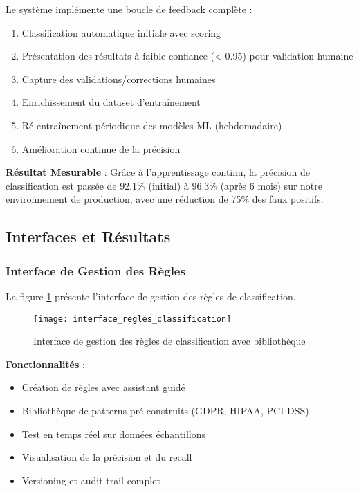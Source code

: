 Le système implémente une boucle de feedback complète :
\begin{enumerate}
    \item Classification automatique initiale avec scoring
    \item Présentation des résultats à faible confiance (< 0.95) pour validation humaine
    \item Capture des validations/corrections humaines
    \item Enrichissement du dataset d'entraînement
    \item Ré-entraînement périodique des modèles ML (hebdomadaire)
    \item Amélioration continue de la précision
\end{enumerate}

\textbf{Résultat Mesurable} : Grâce à l'apprentissage continu, la précision de classification est passée de 92.1\% (initial) à 96.3\% (après 6 mois) sur notre environnement de production, avec une réduction de 75\% des faux positifs.

\subsection{Interfaces et Résultats}

\subsubsection{Interface de Gestion des Règles}

La figure \ref{fig:interface_regles_classification} présente l'interface de gestion des règles de classification.

\begin{figure}[htpb]
\centering
\texttt{[image: interface\_regles\_classification]}
\caption{Interface de gestion des règles de classification avec bibliothèque}
\label{fig:interface_regles_classification}
\end{figure}

\textbf{Fonctionnalités} :
\begin{itemize}
    \item Création de règles avec assistant guidé
    \item Bibliothèque de patterns pré-construits (GDPR, HIPAA, PCI-DSS)
    \item Test en temps réel sur données échantillons
    \item Visualisation de la précision et du recall
    \item Versioning et audit trail complet
\end{itemize}

